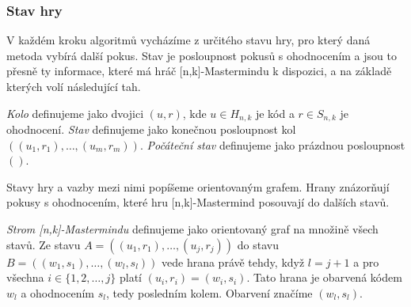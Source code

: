 
\subsubsection{Stav hry}
V každém kroku algoritmů vycházíme z určitého stavu hry, pro který daná metoda vybírá další pokus. Stav je posloupnost pokusů s ohodnocením a jsou to přesně ty informace, které má hráč [n,k]-Mastermindu k dispozici, a na základě kterých volí následující tah.

\begin{definice}\label{stav}
   \emph{Kolo} definujeme jako dvojici $(u,r)$, kde $u \in H_{n,k}$ je kód a $r \in S_{n,k}$ je ohodnocení. 
   \emph{Stav} definujeme jako konečnou posloupnost kol $((u_1, r_1), \dots, (u_m, r_m))$. \emph{Počáteční stav} definujeme jako prázdnou posloupnost $()$.
\end{definice}

Stavy hry a vazby mezi nimi popíšeme orientovaným grafem. Hrany znázorňují pokusy s ohodnocením, které hru [n,k]-Mastermind posouvají do dalších stavů. 
\begin{definice}
  \emph{Strom [n,k]-Mastermindu} definujeme jako orientovaný graf na množině všech stavů. Ze stavu $A = \left((u_1, r_1),\dots, (u_j,r_j)\right)$ do stavu $B = \left((w_1, s_1), \dots, (w_l,s_l)\right)$ vede hrana právě tehdy, když $l = j+1$ a pro všechna $ i \in \{1,2,\dots, j\}$ platí $ (u_i, r_i) = (w_i, s_i)$. Tato hrana je obarvená kódem $w_l$ a ohodnocením $s_l$, tedy posledním kolem. Obarvení značíme $(w_l, s_l)$. 
\end{definice}


